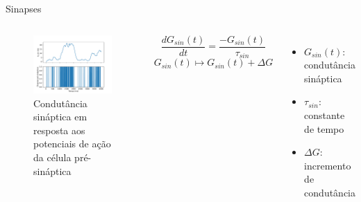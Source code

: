 \begin{frame}{Sinapses}
	\begin{columns}[t]
		\column{5cm}
			\begin{figure}[tb]
				\centering
				\caption{Condutância sináptica em resposta aos potenciais de ação da célula pré-sináptica}
				\label{fig:respostasinaptica}
				\includegraphics[width=0.9\linewidth]{figs/resposta_sinaptica}
			\end{figure}
		\column{5cm}
			\[
				\frac{dG_{sin}(t)}{dt}=\frac{-G_{sin}(t)}{\tau_{sin}}
			\]\[
				G_{sin}(t)\mapsto G_{sin}(t)+\Delta G
			\]
			\begin{itemize}
				\item $G_{sin}(t)$: condutância sináptica
				\item $\tau_{sin}$: constante de tempo
				\item $\Delta G$: incremento de condutância
			\end{itemize}
	\end{columns}
\end{frame}

